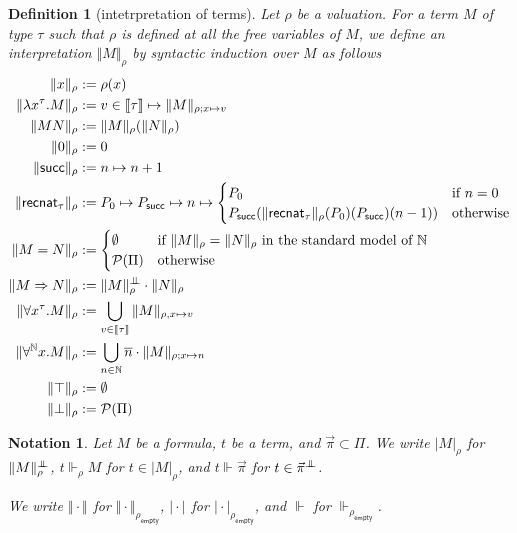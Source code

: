 \documentclass{article}
\newcommand{\successor}{\mathsf{succ}}
\newcommand{\N}{\mathbb{N}}
\newcommand{\depforall}[1]{\forall^\N #1.}
\newcommand{\pole}{{\bot\mkern-10mu\bot}}
\newcommand{\realizes}{\Vdash}
\newcommand{\recnat}[1]{\mathsf{recnat}_{#1}}
\newcommand{\typeinterp}[1]{{\llbracket #1 \rrbracket}}
\newcommand{\terminterp}[2]{\Vert #1 \Vert_{#2}}
\newcommand{\truthinterp}[2]{\vert #1 \vert_{#2}}
\newcommand{\powerset}[1]{\mathcal{P}(#1)}
\newcommand{\emptyval}{{\rho_\mathsf{empty}}}
\newtheorem{definition}{Definition}
\newtheorem{notation}{Notation}
\begin{document}
\begin{definition}[intetrpretation of terms]
    Let $\rho$ be a valuation.
    For a term $M$ of type $\tau$ such that $\rho$ is defined at all the free variables of $M$, we define an interpretation $\terminterp{M}{\rho}$ by syntactic induction over $M$ as follows
    \begin{align*}
        \terminterp{x}{\rho} & := \rho(x) \\
        \terminterp{\lambda x^\tau. M}{\rho} & := v \in \typeinterp{\tau} \mapsto \terminterp{M}{\rho; x \mapsto v} \\
        \terminterp{MN}{\rho} & := \terminterp{M}{\rho}(\terminterp{N}{\rho}) \\
        \terminterp{0}{\rho} & := 0 \\
        \terminterp{\successor}{\rho} & := n \mapsto n + 1 \\
        \terminterp{\recnat{\tau}}{\rho} & := P_0 \mapsto P_\successor \mapsto n \mapsto \begin{cases} P_0 & \text{if $n = 0$} \\ P_\successor(\terminterp{\recnat{\tau}}{\rho}(P_0)(P_\successor)(n-1)) & \text{otherwise} \end{cases} \\
        \terminterp{M = N}{\rho} & := \begin{cases} \emptyset & \text{if $\terminterp{M}{\rho} = \terminterp{N}{\rho}$ in the standard model of $\N$} \\
        \powerset{\Pi} & \text{otherwise} \end{cases} \\
        \terminterp{M \Rightarrow N}{\rho} & := \terminterp{M}{\rho}^\pole \cdot \terminterp{N}{\rho} \\
        \terminterp{\forall x^\tau. M}{\rho} & := \bigcup_{v \in \typeinterp{\tau}} \terminterp{M}{\rho, x \mapsto v} \\
        \terminterp{\depforall{x} M}{\rho} & := \bigcup_{n \in \N} \overline{n} \cdot \terminterp{M}{\rho; x \mapsto n} \\
        \terminterp{\top}{\rho} & := \emptyset \\
        \terminterp{\bot}{\rho} & := \powerset{\Pi} \\
    \end{align*}
\end{definition}

\begin{notation}
    Let $M$ be a formula, $t$ be a term, and $\vec\pi \subset \Pi$.
    We write $\truthinterp{M}{\rho}$ for $\terminterp{M}{\rho}^\pole$, $t \realizes_\rho M$ for $t \in \truthinterp{M}{\rho}$, and $t \realizes \vec\pi$ for $t \in \vec\pi^\pole$.

    We write $\terminterp{\cdot}{}$ for $\terminterp{\cdot}{\emptyval}$, $\truthinterp{\cdot}{}$ for $\truthinterp{\cdot}{\emptyval}$, and $\realizes$ for $\realizes_\emptyval$.
\end{notation}
\end{document}
